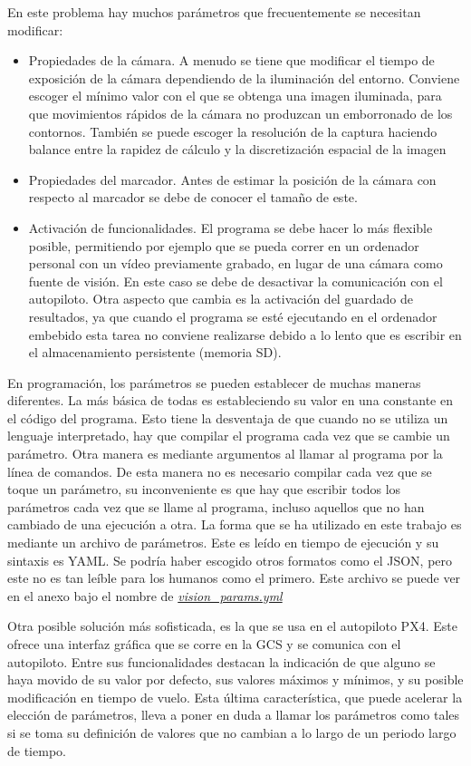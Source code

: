 En este problema hay muchos parámetros que frecuentemente se necesitan modificar:
\begin{itemize}
\item Propiedades de la cámara. A menudo se tiene que modificar el tiempo de exposición de la cámara dependiendo de la iluminación del entorno. Conviene escoger el mínimo valor con el que se obtenga una imagen iluminada, para que movimientos rápidos de la cámara no produzcan un emborronado de los contornos. También se puede escoger la resolución de la captura haciendo balance entre la rapidez de cálculo y la discretización espacial de la imagen 
\item Propiedades del marcador. Antes de estimar la posición de la cámara con respecto al marcador se debe de conocer el tamaño de este.
\item Activación de funcionalidades. El programa se debe hacer lo más flexible posible, permitiendo por ejemplo que se pueda correr en un ordenador personal con un vídeo previamente grabado, en lugar de una cámara como fuente de visión. En este caso se debe de desactivar la comunicación con el autopiloto. Otra aspecto que cambia es la activación del guardado de resultados, ya que cuando el programa se esté ejecutando en el ordenador embebido esta tarea no conviene realizarse debido a lo lento que es escribir en el almacenamiento persistente (memoria SD).  
\end{itemize}

En programación, los parámetros se pueden establecer de muchas maneras diferentes. La más básica de todas es estableciendo su valor en una constante en el código del programa. Esto tiene la desventaja de que cuando no se utiliza un lenguaje interpretado, hay que compilar el programa cada vez que se cambie un parámetro. Otra manera es mediante argumentos al llamar al programa por la línea de comandos. De esta manera no es necesario compilar cada vez que se toque un parámetro, su inconveniente es que hay que escribir todos los parámetros cada vez que se llame al programa, incluso aquellos que no han cambiado de una ejecución a otra. La forma que se ha utilizado en este trabajo es mediante un archivo de parámetros. Este es leído en tiempo de ejecución  y su sintaxis es YAML. Se podría haber escogido otros formatos como el JSON, pero este no es tan leíble para los humanos como el primero. Este archivo se puede ver en el anexo bajo el nombre de \hyperref[sec:vision-params]{\textit{vision\_params.yml}} 

Otra posible solución más sofisticada, es la que se usa en el autopiloto PX4. Este ofrece una interfaz gráfica que se corre en la GCS y se comunica con el autopiloto. Entre sus funcionalidades destacan la indicación de que alguno se haya movido de su valor por defecto, sus valores máximos y mínimos, y su posible modificación en tiempo de vuelo. Esta última característica, que puede acelerar la elección de parámetros, lleva a poner en duda a llamar los parámetros como tales si se toma su definición de valores que no cambian a lo largo de un periodo largo de tiempo.  

